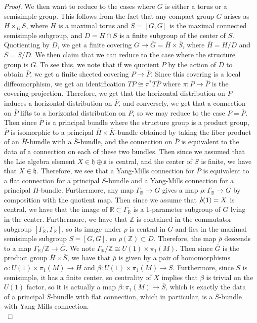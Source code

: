 \documentclass[psamsfonts, 12pt]{amsart}
\theoremstyle{definition}
\theoremstyle{remark}
\newcommand{\R}{\mathbb{R}}
\newcommand{\Z}{\mathbb{Z}}
\newcommand*{\dt}[1]{%
   \accentset{\mbox{\large\bfseries .}}{#1}}
\begin{document}
\begin{proof}
We then want to reduce to the cases where $G$ is either a torus or a semisimple group.
This follows from the fact that any compact group $G$ arises as $H \times_D S$, where
$H$ is a maximal torus and $S = [G,G]$ is the maximal connected semisimple subgroup,
and $D = H \cap S$ is a finite subgroup of the center of $S$. Quotienting by $D$, we
get a finite covering $G \to \overline{G} = \overline{H} \times \overline{S}$, where
$\overline{H} = H/D$ and $\overline{S} = S/D$. We then claim that we can reduce to
the case where the structure group is $\overline{G}$. To see this, we note that
if we quotient $P$ by the action of $D$ to obtain $\overline{P}$, we get a finite
sheeted covering $P \to \overline{P}$. Since this covering is a local diffeomorphism,
we get an identification $TP \cong \pi^*T\overline{P}$ where $\pi : P \to \overline{P}$
is the covering projection. Therefore, we get that the horizontal distribution on
$P$ induces a horizontal distribution on $\overline{P}$, and conversely, we get
that a connection on $\overline{P}$ lifts to a horizontal distribution on $P$, so we
may reduce to the case $P = \overline{P}$. Then since $\overline{P}$ is a principal
bundle where the structure group is a product group, $\overline{P}$ is isomorphic
to a principal $\overline{H} \times \overline{K}$-bundle obtained by taking the
fiber product of an $\overline{H}$-bundle with a $\overline{S}$-bundle, and
the connection on $\overline{P}$ is equivalent to the data of a connection
on each of these two bundles. Then since we assumed that the Lie algebra
element $X \in \mathfrak{h} \oplus \mathfrak{s}$ is central, and the center of
$S$ is finite, we have that $X \in \mathfrak{h}$. Therefore, we see that a Yang-Mills
connection for $\overline{P}$ is equivalent to a flat connection for a principal
$\overline{S}$-bundle and a Yang-Mills connection for a principal
$\overline{H}$-bundle. Furthermore, any map  $\Gamma_\R \to G$ gives a map
$\overline{\rho} : \Gamma_\R \to \overline{G}$ by composition with the quotient map.
Then since we assume that $\dt{\rho}(1) = X$ is central, we have that the image of
$\R \subset \Gamma_\R$ is a $1$-parameter subgroup of $G$ lying in the center.
Furthermore, we have that $\Z$ is contained in the commutator subgroup
$[\Gamma_\R,\Gamma_\R]$, so its image under $\rho$ is central in
$G$ and lies in the maximal semisimple subgroup $S = [G,G]$, so $\rho(\Z) \subset D$.
Therefore, the map $\overline{\rho}$ descends to a map
$\Gamma_\R / \Z \to \overline{G}$. We note $\Gamma_\R / \Z \cong U(1) \times \pi_1(M)$.
Then since $\overline{G}$ is the product group $\overline{H} \times \overline{S}$, we
have that $\overline{\rho}$ is given by a pair of homomorphisms
$\alpha : U(1) \times \pi_1(M) \to \overline{H}$ and
$\beta : U(1) \times \pi_1(M) \to \overline{S}$. Furthermore, since $\overline{S}$
is semisimple, it has a finite center, so centrality of $X$ implies that $\beta$
is trivial on the $U(1)$ factor, so it is actually a map
$\beta : \pi_1(M) \to \overline{S}$, which is exactly the data of a principal
$\overline{S}$-bundle with flat connection, which in particular, is a
$\overline{S}$-bundle with Yang-Mills connection. \\


\end{proof}
\end{document}
